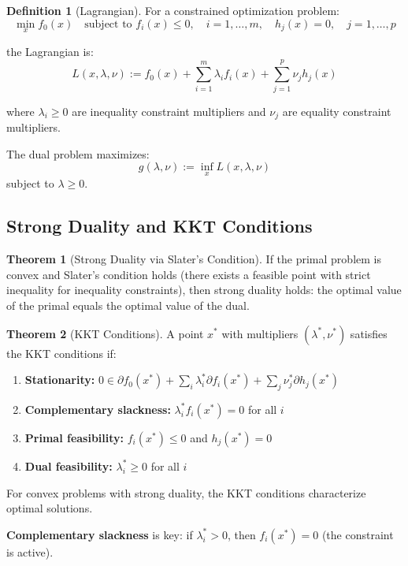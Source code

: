 \documentclass[12pt,a4paper]{article}
\theoremstyle{definition}
\newtheorem{definition}{Definition}[section]
\newtheorem{theorem}{Theorem}[section]
\begin{document}
\begin{definition}[Lagrangian]
For a constrained optimization problem:
\[
\min_x f_0(x) \quad \text{subject to } f_i(x) \leq 0, \quad i=1,\ldots,m, \quad h_j(x) = 0, \quad j=1,\ldots,p
\]

the Lagrangian is:
\[
L(x, \lambda, \nu) := f_0(x) + \sum_{i=1}^{m} \lambda_i f_i(x) + \sum_{j=1}^{p} \nu_j h_j(x)
\]

where $\lambda_i \geq 0$ are inequality constraint multipliers and $\nu_j$ are equality constraint multipliers.
\end{definition}

The dual problem maximizes:
\[
g(\lambda, \nu) := \inf_x L(x, \lambda, \nu)
\]
subject to $\lambda \geq 0$.

\subsection{Strong Duality and KKT Conditions}

\begin{theorem}[Strong Duality via Slater's Condition]
If the primal problem is convex and Slater's condition holds (there exists a feasible point with strict inequality for inequality constraints), then strong duality holds: the optimal value of the primal equals the optimal value of the dual.
\end{theorem}

\begin{theorem}[KKT Conditions]
A point $x^*$ with multipliers $(\lambda^*, \nu^*)$ satisfies the KKT conditions if:

\begin{enumerate}
    \item \textbf{Stationarity:} $0 \in \partial f_0(x^*) + \sum_i \lambda_i^* \partial f_i(x^*) + \sum_j \nu_j^* \partial h_j(x^*)$
    
    \item \textbf{Complementary slackness:} $\lambda_i^* f_i(x^*) = 0$ for all $i$
    
    \item \textbf{Primal feasibility:} $f_i(x^*) \leq 0$ and $h_j(x^*) = 0$
    
    \item \textbf{Dual feasibility:} $\lambda_i^* \geq 0$ for all $i$
\end{enumerate}

For convex problems with strong duality, the KKT conditions characterize optimal solutions.
\end{theorem}

\textbf{Complementary slackness} is key: if $\lambda_i^* > 0$, then $f_i(x^*) = 0$ (the constraint is active).
\end{document}
